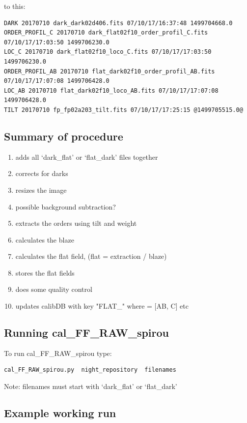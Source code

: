 \noindent to this:

\begin{lstlisting}[style=text]
DARK 20170710 dark_dark02d406.fits 07/10/17/16:37:48 1499704668.0
ORDER_PROFIL_C 20170710 dark_flat02f10_order_profil_C.fits 07/10/17/17:03:50 1499706230.0
LOC_C 20170710 dark_flat02f10_loco_C.fits 07/10/17/17:03:50 1499706230.0
ORDER_PROFIL_AB 20170710 flat_dark02f10_order_profil_AB.fits 07/10/17/17:07:08 1499706428.0
LOC_AB 20170710 flat_dark02f10_loco_AB.fits 07/10/17/17:07:08 1499706428.0
TILT 20170710 fp_fp02a203_tilt.fits 07/10/17/17:25:15 @1499705515.0@

\end{lstlisting}

\subsection{Summary of procedure}
\begin{enumerate}
\item adds all `dark\_flat' or `flat\_dark' files together
\item corrects for darks
\item resizes the image
\item possible background subtraction?
\item extracts the orders using tilt and weight
\item calculates the blaze
\item calculates the flat field, (flat = extraction / blaze)
\item stores the flat fields
\item does some quality control
\item updates calibDB with key "FLAT\_" where  = [AB, C] etc
\end{enumerate}

\subsection{Running cal\_FF\_RAW\_spirou}

To run cal\_FF\_RAW\_spirou type:
\begin{lstlisting}[language=bash, style=bashstyle]
cal_FF_RAW_spirou.py  night_repository  filenames
\end{lstlisting}

\noindent Note: filenames must start with `dark\_flat' or `flat\_dark'

\subsection{Example working run}

